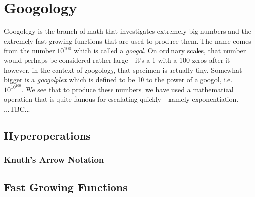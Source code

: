 \chapter{Googology}
Googology is the branch of math that investigates extremely big numbers and the extremely fast growing functions that are used to produce them. The name comes from the number $10^{100}$ which is called a \emph{googol}. On ordinary scales, that number would perhaps be considered rather large - it's a 1 with a 100 zeros after it - however, in the context of googology, that specimen is actually tiny. Somewhat bigger is a \emph{googolplex} which is defined to be 10 to the power of a googol, i.e. $10^{10^{100}}$. We see that to produce these numbers, we have used a mathematical operation that is quite famous for escalating quickly - namely exponentiation.  ...TBC...





\section{Hyperoperations}

\subsection{Knuth's Arrow Notation}



\section{Fast Growing Functions}




